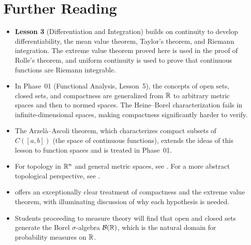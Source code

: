 \documentclass[11pt,a4paper]{article}
\begin{document}
\section{Further Reading}
\label{sec:further_reading}

\begin{itemize}
  \item \textbf{Lesson 3} (Differentiation and Integration) builds on
    continuity to develop differentiability, the mean value theorem,
    Taylor's theorem, and Riemann integration. The extreme value theorem
    proved here is used in the proof of Rolle's theorem, and uniform
    continuity is used to prove that continuous functions are Riemann
    integrable.

  \item In Phase~01 (Functional Analysis, Lesson~5), the concepts of
    open sets, closed sets, and compactness are generalized from $\mathbb{R}$ to
    arbitrary metric spaces and then to normed spaces. The Heine--Borel
    characterization fails in infinite-dimensional spaces, making
    compactness significantly harder to verify.

  \item The Arzel\`{a}--Ascoli theorem, which characterizes compact
    subsets of $C([a,b])$ (the space of continuous functions), extends
    the ideas of this lesson to function spaces and is treated in
    Phase~01.

  \item For topology in $\mathbb{R}^n$ and general metric spaces, see
    \citet[Chapter 2]{rudin1976}. For a more abstract topological
    perspective, see \citet[Chapter 4]{folland1999}.

  \item \citet[Chapters 3--4]{abbott2015} offers an exceptionally clear
    treatment of compactness and the extreme value theorem, with
    illuminating discussion of why each hypothesis is needed.

  \item Students proceeding to measure theory will find that open and
    closed sets generate the Borel $\sigma$-algebra $\mathcal{B}(\mathbb{R})$, which
    is the natural domain for probability measures on $\mathbb{R}$.
\end{itemize}


\end{document}
